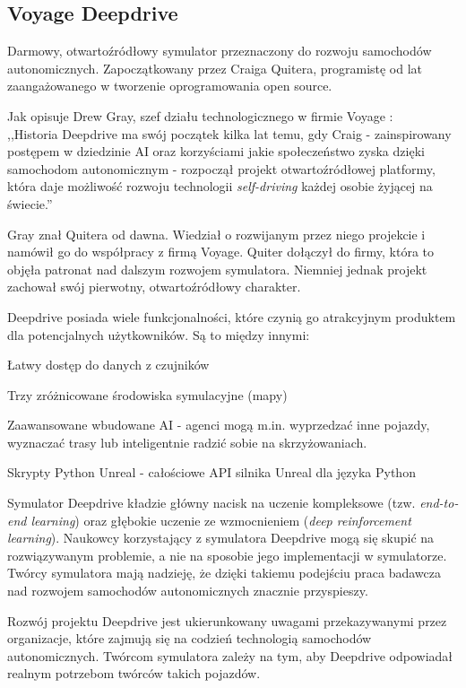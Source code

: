\subsection{Voyage Deepdrive}
Darmowy, otwartoźródłowy symulator przeznaczony do rozwoju samochodów autonomicznych. Zapoczątkowany przez Craiga Quitera, programistę od lat zaangażowanego w tworzenie oprogramowania open source.

Jak opisuje Drew Gray, szef działu technologicznego \cite{investopedia:CTO} w firmie Voyage \cite{voyage:introducingDeepdrive}: \\
,,Historia Deepdrive ma swój początek kilka lat temu, gdy Craig - zainspirowany postępem w dziedzinie AI oraz korzyściami jakie społeczeństwo zyska dzięki samochodom autonomicznym - rozpoczął projekt otwartoźródłowej platformy, która daje możliwość rozwoju technologii \textit{self-driving} każdej osobie żyjącej na świecie.''

Gray znał Quitera od dawna. Wiedział o rozwijanym przez niego projekcie i namówił go do współpracy z firmą Voyage. Quiter dołączył do firmy, która to objęła patronat nad dalszym rozwojem symulatora. Niemniej jednak projekt zachował swój pierwotny, otwartoźródłowy charakter.

Deepdrive posiada wiele funkcjonalności, które czynią go atrakcyjnym produktem dla potencjalnych użytkowników. Są to między innymi:
\begin{itemize*}
\item Łatwy dostęp do danych z czujników
\item Trzy zróżnicowane środowiska symulacyjne (mapy)
\item Zaawansowane wbudowane AI - agenci mogą m.in. wyprzedzać inne pojazdy, wyznaczać trasy lub inteligentnie radzić sobie na skrzyżowaniach.
\item Skrypty Python Unreal - całościowe API silnika Unreal \cite{unrealEngine:features} dla języka Python
\end{itemize*}

Symulator Deepdrive kładzie główny nacisk na uczenie kompleksowe (tzw. \textit{end-to-end learning}) oraz głębokie uczenie ze wzmocnieniem (\textit{deep reinforcement learning}). Naukowcy korzystający z symulatora Deepdrive mogą się skupić na rozwiązywanym problemie, a nie na sposobie jego implementacji w symulatorze. Twórcy symulatora mają nadzieję, że dzięki takiemu podejściu praca badawcza nad rozwojem samochodów autonomicznych znacznie przyspieszy.

Rozwój projektu Deepdrive jest ukierunkowany uwagami przekazywanymi przez organizacje, które zajmują się na codzień technologią samochodów autonomicznych. Twórcom symulatora zależy na tym, aby Deepdrive odpowiadał realnym potrzebom twórców takich pojazdów.

